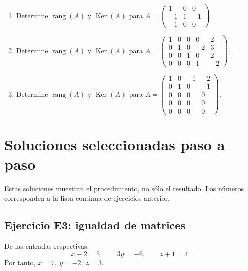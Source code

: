 \documentclass[12pt]{article}
\theoremstyle{remark}
\newcommand{\rang}{\operatorname{rang}}
\newcommand{\Ker}{\operatorname{Ker}}
\newcounter{contadorEjercicio}
\newenvironment{listaejercicios}{\begin{enumerate}[label=\textbf{E\arabic*.},leftmargin=2.4em,itemsep=0.52em]\setcounter{enumi}{\value{contadorEjercicio}}}{\setcounter{contadorEjercicio}{\value{enumi}}\end{enumerate}}
\begin{document}
\begin{listaejercicios}
\item Determine $\rang(A)$ y $\Ker(A)$ para $A=\begin{pmatrix}1&0&0\\-1&1&-1\\-1&0&0\end{pmatrix}$.

\item Determine $\rang(A)$ y $\Ker(A)$ para $A=\begin{pmatrix}1&0&0&0&2\\0&1&0&-2&3\\0&0&1&0&2\\0&0&0&1&-2\end{pmatrix}$.

\item Determine $\rang(A)$ y $\Ker(A)$ para $A=\begin{pmatrix}1&0&-1&-2\\0&1&0&-1\\0&0&0&0\\0&0&0&0\\0&0&0&0\end{pmatrix}$.

\end{listaejercicios}


\appendix
\section{Soluciones seleccionadas paso a paso}
Estas soluciones muestran el procedimiento, no sólo el resultado. Los números corresponden a la lista continua de ejercicios anterior.

\subsection*{Ejercicio E3: igualdad de matrices}
De las entradas respectivas:
\[
x-2=5,\qquad 3y=-6,\qquad z+1=4.
\]
Por tanto, $\boxed{x=7,\ y=-2,\ z=3}$.
\end{document}
